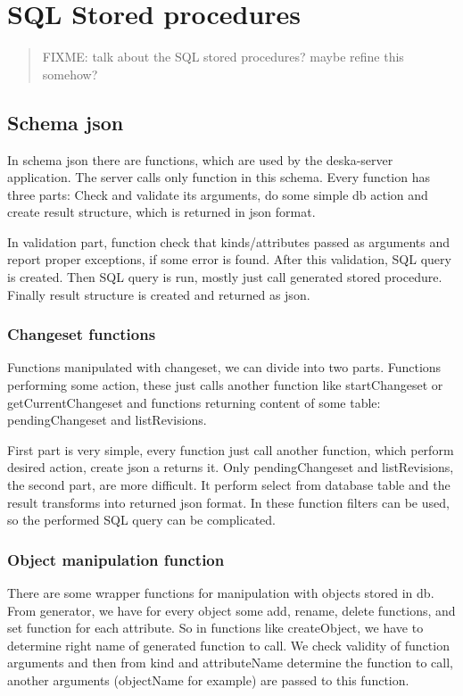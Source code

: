 \documentclass[deska]{subfiles}
\begin{document}
\chapter{SQL Stored procedures}
\label{sec:sql-procedures}

\begin{abstract}
FIXME: talk about the SQL stored procedures? maybe refine this somehow?
\end{abstract}

\section{Schema json}
In schema json there are functions, which are used by the deska-server application. The server calls only function in this schema. Every function has three parts: Check and validate its arguments, do some simple db action and create result structure, which is returned in json format.

In validation part, function check that kinds/attributes passed as arguments and report proper exceptions, if some error is found.
After this validation, SQL query is created. Then SQL query is run, mostly just call generated stored procedure. Finally result structure is created and returned as json.

\subsection{Changeset functions}
Functions manipulated with changeset, we can divide into two parts. Functions performing some action, these just calls another function like startChangeset or getCurrentChangeset and functions returning content of some table: pendingChangeset and listRevisions.

First part is very simple, every function just call another function, which perform desired action, create json a returns it.
Only pendingChangeset and listRevisions, the second part, are more difficult. It perform select from database table and the result transforms into returned json format. In these function filters can be used, so the performed SQL query can be complicated.

\subsection{Object manipulation function}
There are some wrapper functions for manipulation with objects stored in db. From generator, we have for every object some add, rename, delete functions, and set function for each attribute. So in functions like createObject, we have to determine right name of generated function to call. We check validity of function arguments and then from kind and attributeName determine the function to call, another arguments (objectName for example) are passed to this function.
\end{document}

